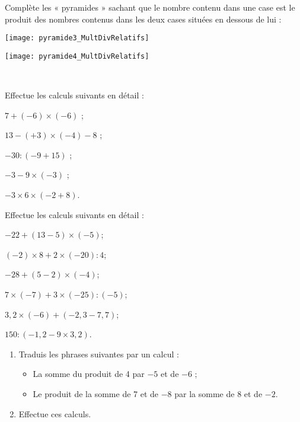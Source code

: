 \begin{exercice}
Complète les « pyramides » sachant que le nombre contenu dans une case est le produit des nombres contenus dans les deux cases situées en dessous de lui : \\[0.3em]

\begin{minipage}[c]{0.48\linewidth}
\begin{center} \texttt{[image: pyramide3\_MultDivRelatifs]} \end{center}
\end{minipage} \hfill%
 \begin{minipage}[c]{0.48\linewidth}
\begin{center} \texttt{[image: pyramide4\_MultDivRelatifs]} \end{center}  
\end{minipage} \\
\end{exercice}


\begin{exercice}
Effectue les calculs suivants en détail :
\begin{colenumerate}{2}
 \item $7 + (-6) \times (-6)$ ;
 \item $13 - (+3) \times (-4) - 8$ ;
 \item $-30 : (-9 + 15)$ ;
 \item $-3 -9 \times (-3)$ ;
 \item $-3 \times 6 \times (-2 + 8)$.
 \end{colenumerate}
\end{exercice}


\begin{exercice}
Effectue les calculs suivants en détail :
{\footnotesize
\begin{colenumerate}{2}
 \item $-22 + (13 - 5) \times (-5)$;
 \item $(-2) \times 8 + 2 \times (-20) : 4$;
 \item $-28 + (5 - 2) \times (-4)$;
 \item $7 \times (-7) + 3 \times (-25) : (-5)$;
 \item $3,2 \times (-6) + (-2,3 - 7,7)$;
 \item $150 : (-1,2 - 9 \times 3,2)$.
 \end{colenumerate}}
\end{exercice}


\begin{exercice}[Vocabulaire]
\begin{enumerate}
 \item Traduis les phrases suivantes par un calcul :
 \begin{itemize}
  \item \textcolor{A1}{La somme du produit de 4 par $-5$ et de $-6$ ;}
  \item \textcolor{H1}{Le produit de la somme de 7 et de $-8$ par la somme de 8 et de $-2$.}
  \end{itemize}  
 \item Effectue ces calculs.
 \end{enumerate}
\end{exercice}


